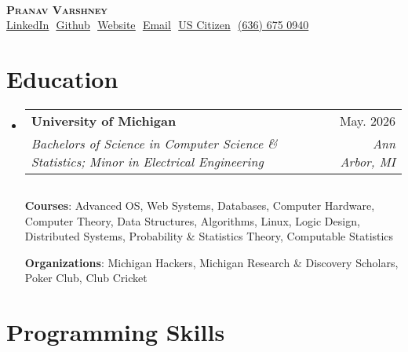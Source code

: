 \documentclass[letterpaper,11pt]{article}
\makeatletter
\newcommand{\resumeSubheading}[4]{
  \vspace{-2pt}\item
    \begin{tabular*}{0.97\textwidth}[t]{l@{\extracolsep{\fill}}r}
      \textbf{#1} & #2 \\
      \textit{\small#3} & \textit{\small #4} \\
    \end{tabular*}\vspace{-7pt}
}
\newcommand{\resumeSubHeadingListStart}{\begin{itemize}[leftmargin=0.15in, 
label={}]}
\newcommand{\resumeSubHeadingListEnd}{\end{itemize}}
\makeatother
\begin{document}

\begin{center}
\textbf{} \\ \vspace{2pt}
    \textbf{\Huge \scshape Pranav Varshney} \\ \vspace{4pt}
    \small 
    \href{https://linkedin.com/in/pvarshh}{\underline{LinkedIn}} $ $
    \href{https://github.com/pvarshh}{\underline{Github}} $ $
    \href{https://term-nav.vercel.app/}
    {\underline{Website}} $  $
    \href{mailto:pvarsh@umich.edu}
    {\underline{Email}} $ $
    {\underline{US Citizen}} $ $
    {\underline{(636) 675 0940}}
\end{center}


\section{Education}
  \resumeSubHeadingListStart
    \resumeSubheading
      {University of Michigan }{May. 2026}
      {Bachelors of Science in Computer Science \& Statistics; Minor in 
Electrical Engineering}{Ann Arbor, MI} $ $

      \textbf{Courses}{: Advanced OS, Web Systems, Databases, Computer 
Hardware, Computer Theory, Data Structures, Algorithms, Linux, Logic 
Design, Distributed Systems, Probability \& Statistics Theory, Computable 
Statistics}

      \vspace{-2pt}

      \textbf{Organizations}{: Michigan Hackers, Michigan Research \& 
Discovery Scholars, Poker Club, Club Cricket}

  \resumeSubHeadingListEnd

\section{Programming Skills}
\end{document}
